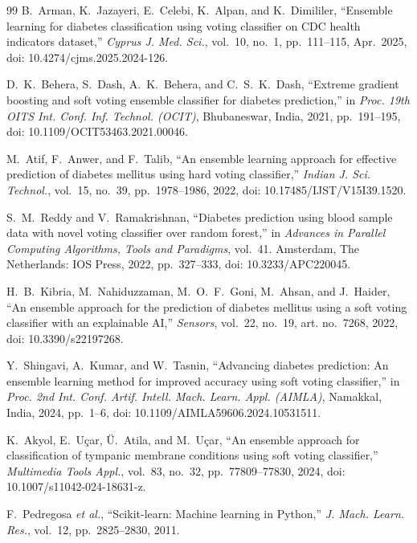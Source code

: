 \documentclass[conference]{IEEEtran}
\begin{document}
\begin{thebibliography}{99}
B.~Arman, K.~Jazayeri, E.~Celebi, K.~Alpan, and K.~Dimililer, ``Ensemble learning for diabetes classification using voting classifier on CDC health indicators dataset,'' \textit{Cyprus J. Med. Sci.}, vol.~10, no.~1, pp.~111--115, Apr.~2025, doi: 10.4274/cjms.2025.2024-126.

D.~K.~Behera, S.~Dash, A.~K.~Behera, and C.~S.~K.~Dash, ``Extreme gradient boosting and soft voting ensemble classifier for diabetes prediction,'' in \textit{Proc. 19th OITS Int. Conf. Inf. Technol. (OCIT)}, Bhubaneswar, India, 2021, pp.~191--195, doi: 10.1109/OCIT53463.2021.00046.

M.~Atif, F.~Anwer, and F.~Talib, ``An ensemble learning approach for effective prediction of diabetes mellitus using hard voting classifier,'' \textit{Indian J. Sci. Technol.}, vol.~15, no.~39, pp.~1978--1986, 2022, doi: 10.17485/IJST/V15I39.1520.

S.~M.~Reddy and V.~Ramakrishnan, ``Diabetes prediction using blood sample data with novel voting classifier over random forest,'' in \textit{Advances in Parallel Computing Algorithms, Tools and Paradigms}, vol.~41. Amsterdam, The Netherlands: IOS Press, 2022, pp.~327--333, doi: 10.3233/APC220045.

H.~B.~Kibria, M.~Nahiduzzaman, M.~O.~F.~Goni, M.~Ahsan, and J.~Haider, ``An ensemble approach for the prediction of diabetes mellitus using a soft voting classifier with an explainable AI,'' \textit{Sensors}, vol.~22, no.~19, art. no.~7268, 2022, doi: 10.3390/s22197268.

Y.~Shingavi, A.~Kumar, and W.~Tasnin, ``Advancing diabetes prediction: An ensemble learning method for improved accuracy using soft voting classifier,'' in \textit{Proc. 2nd Int. Conf. Artif. Intell. Mach. Learn. Appl. (AIMLA)}, Namakkal, India, 2024, pp.~1--6, doi: 10.1109/AIMLA59606.2024.10531511.

K.~Akyol, E.~U\c{c}ar, \"{U}.~Atila, and M.~U\c{c}ar, ``An ensemble approach for classification of tympanic membrane conditions using soft voting classifier,'' \textit{Multimedia Tools Appl.}, vol.~83, no.~32, pp.~77809--77830, 2024, doi: 10.1007/s11042-024-18631-z.

F.~Pedregosa \textit{et al.}, ``Scikit-learn: Machine learning in Python,'' \textit{J. Mach. Learn. Res.}, vol.~12, pp.~2825--2830, 2011.


\end{thebibliography}
\end{document}
